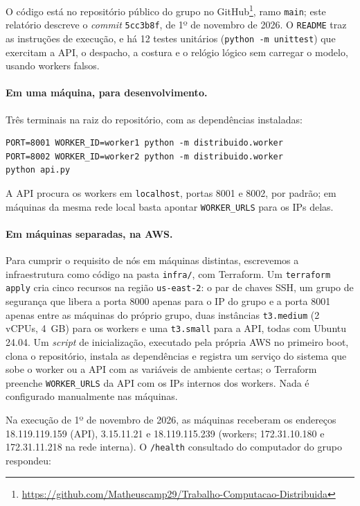 \documentclass{sbc2023}
\begin{document}
O código está no repositório público do grupo no GitHub\footnote{\url{https://github.com/Matheuscamp29/Trabalho-Computacao-Distribuida}}, ramo \texttt{main}; este relatório descreve o \emph{commit} \texttt{5cc3b8f}, de 1º de novembro de 2026. O \texttt{README} traz as instruções de execução, e há 12 testes unitários (\texttt{python -m unittest}) que exercitam a API, o despacho, a costura e o relógio lógico sem carregar o modelo, usando workers falsos.

\paragraph{Em uma máquina, para desenvolvimento.} Três terminais na raiz do repositório, com as dependências instaladas:

{\scriptsize
\begin{verbatim}
PORT=8001 WORKER_ID=worker1 python -m distribuido.worker
PORT=8002 WORKER_ID=worker2 python -m distribuido.worker
python api.py
\end{verbatim}}

\noindent A API procura os workers em \texttt{localhost}, portas 8001 e 8002, por padrão; em máquinas da mesma rede local basta apontar \texttt{WORKER\_URLS} para os IPs delas.

\paragraph{Em máquinas separadas, na AWS.} Para cumprir o requisito de nós em máquinas distintas, escrevemos a infraestrutura como código na pasta \texttt{infra/}, com Terraform. Um \texttt{terraform apply} cria cinco recursos na região \texttt{us-east-2}: o par de chaves SSH, um grupo de segurança que libera a porta 8000 apenas para o IP do grupo e a porta 8001 apenas entre as máquinas do próprio grupo, duas instâncias \texttt{t3.medium} (2 vCPUs, 4~GB) para os workers e uma \texttt{t3.small} para a API, todas com Ubuntu 24.04. Um \emph{script} de inicialização, executado pela própria AWS no primeiro boot, clona o repositório, instala as dependências e registra um serviço do sistema que sobe o worker ou a API com as variáveis de ambiente certas; o Terraform preenche \texttt{WORKER\_URLS} da API com os IPs internos dos workers. Nada é configurado manualmente nas máquinas.

Na execução de 1º de novembro de 2026, as máquinas receberam os endereços 18.119.119.159 (API), 3.15.11.21 e 18.119.115.239 (workers; 172.31.10.180 e 172.31.11.218 na rede interna). O \texttt{/health} consultado do computador do grupo respondeu:
\end{document}

